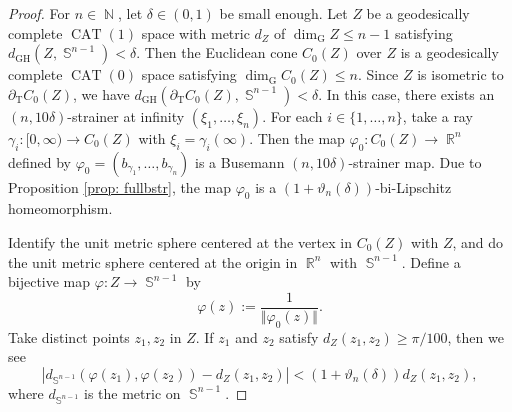 \documentclass[10pt,a4paper]{amsart}
\newcommand{\CAT}{\operatorname{CAT}}
\newcommand{\GH}{\operatorname{\mathrm{GH}}}
\newcommand{\N}{\operatorname{\mathbb{N}}}
\newcommand{\R}{\operatorname{\mathbb{R}}}
\newcommand{\Sph}{\operatorname{\mathbb{S}}}
\begin{document}
\begin{proof}
For $n \in \N$,
let $\delta \in (0,1)$ be small enough.
Let $Z$ be a geodesically complete $\CAT(1)$ space with metric $d_Z$
of $\dim_{\mathrm{G}}Z \le n-1$
satisfying $d_{\GH} \left( Z, \Sph^{n-1} \right) < \delta$.
Then the Euclidean cone $C_0(Z)$ over $Z$
is a geodesically complete $\CAT(0)$ space
satisfying $\dim_{\mathrm{G}}C_0(Z) \le n$.
Since $Z$ is isometric to $\partial_{\mathrm{T}}C_0(Z)$,
we have 
$d_{\GH} \left( \partial_{\mathrm{T}}C_0(Z), \Sph^{n-1} \right) < \delta$.
In this case,
there exists an $(n,10\delta)$-strainer at infinity
$\left( \xi_1, \dots, \xi_n \right)$.
For each $i \in \{ 1, \dots, n \}$,
take a ray $\gamma_i \colon [0,\infty) \to C_0(Z)$
with $\xi_i = \gamma_i(\infty)$.
Then the map $\varphi_0 \colon C_0(Z) \to \R^n$
defined by 
$\varphi_0 = \left( b_{\gamma_1}, \dots, b_{\gamma_n} \right)$
is a Busemann $(n,10\delta)$-strainer map.
Due to Proposition \ref{prop: fullbstr},
the map
$\varphi_0$ is a 
$\left( 1+\vartheta_n(\delta) \right)$-bi-Lipschitz homeomorphism.

Identify the unit metric sphere centered at the vertex in $C_0(Z)$ with 
$Z$,
and do the unit metric sphere centered at the origin in $\R^n$ with 
$\Sph^{n-1}$.
Define a bijective map $\varphi \colon Z \to \Sph^{n-1}$
by
\[
\varphi(z) := \frac{1}{\Vert \varphi_0(z) \Vert}.
\]
Take distinct points $z_1, z_2$ in $Z$.
If $z_1$ and $z_2$ satisfy $d_Z(z_1,z_2) \ge \pi/100$,
then we see 
\[
\left\vert
d_{\Sph^{n-1}} \left( \varphi(z_1), \varphi(z_2) \right) - 
d_Z \left( z_1, z_2 \right) 
\right\vert
< \left( 1+ \vartheta_n(\delta) \right) d_Z \left( z_1, z_2 \right),
\]
where $d_{\Sph^{n-1}}$ is the metric on $\Sph^{n-1}$.


\end{proof}
\end{document}
